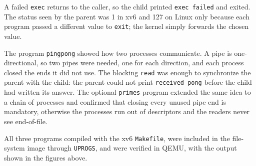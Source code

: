 \documentclass[12pt,a4paper]{article}
\begin{document}
A failed \texttt{exec} returns to the caller, so the child printed \texttt{exec failed} and exited. The status seen by the parent was 1 in xv6 and 127 on Linux only because each program passed a different value to \texttt{exit}; the kernel simply forwards the chosen value.

The program \texttt{pingpong} showed how two processes communicate. A pipe is one-directional, so two pipes were needed, one for each direction, and each process closed the ends it did not use. The blocking \texttt{read} was enough to synchronize the parent with the child: the parent could not print \texttt{received pong} before the child had written its answer. The optional \texttt{primes} program extended the same idea to a chain of processes and confirmed that closing every unused pipe end is mandatory, otherwise the processes run out of descriptors and the readers never see end-of-file.

All three programs compiled with the xv6 \texttt{Makefile}, were included in the file-system image through \texttt{UPROGS}, and were verified in QEMU, with the output shown in the figures above.
\end{document}
